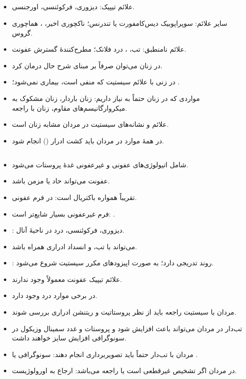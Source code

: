 \subsection*{}
\begin{itemize}
\item علائم تیپیک: دیزوری، فرکوئنسی، اورجنسی.
\item سایر علائم: سوپراپوبیک دیس‌کامفورت یا تندرنس؛ ناکچوری اخیر، ، هماچوری گروس.
\item علائم نامنطبق: تب، ، درد فلانک؛ مطرح‌کنندهٔ گسترش عفونت.
\item در زنان می‌توان صرفاً بر مبنای شرح حال درمان کرد.
\item در زنی با علائم سیستیت که  منفی است، بیماری  نمی‌شود؛ .
\item مواردی که در زنان حتماً به  نیاز داریم: زنان باردار، زنان مشکوک به میکروارگانیسم‌های مقاوم، زنان با  راجعه.
\item علائم و نشانه‌های سیستیت در مردان مشابه زنان است.
\item در همهٔ موارد  در مردان باید کشت ادرار () انجام شود.
\end{itemize}

\subsection*{}
\begin{itemize}
\item شامل اتیولوژی‌های عفونی و غیرعفونی غدهٔ پروستات می‌شود.
\item عفونت می‌تواند حاد یا مزمن باشد.
\item تقریباً همواره باکتریال است: در فرم عفونی.
\item فرم غیرعفونی بسیار شایع‌تر است: .
\end{itemize}

\begin{itemize}
\item {}: دیزوری، فرکوئنسی، درد در ناحیهٔ آنال.
\item می‌تواند با تب،  و انسداد ادراری همراه باشد.
\item {}: روند تدریجی دارد؛ به صورت اپیزودهای مکرر سیستیت شروع می‌شود.
\end{itemize}
\begin{itemize}
\item علائم تیپیک عفونت معمولاً وجود ندارند.
\item در برخی موارد درد وجود دارد.
\item مردان با سیستیت راجعه باید از نظر پروستاتیت و ریتنشن ادراری بررسی شوند.
\item {} تب‌دار در مردان می‌تواند باعث افزایش  شود و پروستات و غدد سمینال وزیکول در سونوگرافی افزایش سایز خواهند داشت.
\item مردان با  تب‌دار حتماً باید تصویربرداری انجام دهند: سونوگرافی یا .
\item در مردان اگر تشخیص  غیرقطعی است یا  راجعه می‌باشد: ارجاع به اورولوژیست.
\end{itemize}

